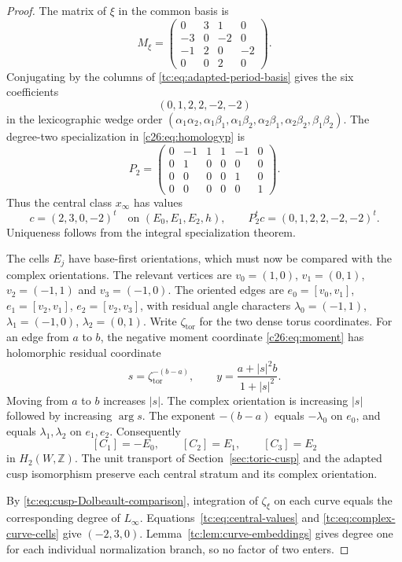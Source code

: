 \begin{proof}
The matrix of $\xi$ in the common basis is
\[
 M_\xi=\begin{pmatrix}
 0&3&1&0\\-3&0&-2&0\\-1&2&0&-2\\0&0&2&0
 \end{pmatrix}.
\]
Conjugating by the columns of
\eqref{tc:eq:adapted-period-basis} gives the six coefficients
\begin{equation}\label{tc:eq:adapted-xi}
                 (0,1,2,2,-2,-2)
\end{equation}
in the lexicographic wedge order
$(\alpha_1\alpha_2,\alpha_1\beta_1,\alpha_1\beta_2,
  \alpha_2\beta_1,\alpha_2\beta_2,\beta_1\beta_2)$.
The degree-two specialization in \eqref{c26:eq:homologyp} is
\[
 P_2=\begin{pmatrix}
 0&-1&1&1&-1&0\\
 0&1&0&0&0&0\\
 0&0&0&0&1&0\\
 0&0&0&0&0&1
 \end{pmatrix}.
\]
Thus the central class $x_\infty$ has values
\begin{equation}\label{tc:eq:central-values}
       c=(2,3,0,-2)^t
       \quad\text{on }(E_0,E_1,E_2,h),
       \qquad P_2^tc=(0,1,2,2,-2,-2)^t.
\end{equation}
Uniqueness follows from the integral specialization theorem.

The cells $E_j$ have base-first orientations, which must now
be compared with the complex orientations.
The relevant vertices are
$v_0=(1,0)$, $v_1=(0,1)$, $v_2=(-1,1)$ and $v_3=(-1,0)$.
The oriented edges are
$e_0=[v_0,v_1]$, $e_1=[v_2,v_1]$, $e_2=[v_2,v_3]$,
with residual angle characters
$\lambda_0=(-1,1)$, $\lambda_1=(-1,0)$, $\lambda_2=(0,1)$.
Write $\zeta_{\mathrm{tor}}$ for the two dense torus coordinates.
For an edge from $a$ to $b$, the negative moment coordinate
\eqref{c26:eq:moment} has holomorphic residual coordinate
\[
 s=\zeta_{\mathrm{tor}}^{-(b-a)},\qquad
                  y=\frac{a+|s|^2b}{1+|s|^2}.
\]
Moving from $a$ to $b$ increases $|s|$.
The complex orientation is increasing $|s|$ followed by
increasing $\arg s$. The exponent $-(b-a)$ equals
$-\lambda_0$ on $e_0$, and equals $\lambda_1,\lambda_2$
on $e_1,e_2$. Consequently
\begin{equation}\label{tc:eq:complex-curve-cells}
                  [C_1]=-E_0,\qquad [C_2]=E_1,
                  \qquad [C_3]=E_2
\end{equation}
in $H_2(W,\mathbb Z)$.
The unit transport of Section~\ref{sec:toric-cusp} and the
adapted cusp isomorphism preserve each central stratum and
its complex orientation.

By \eqref{tc:eq:cusp-Dolbeault-comparison}, integration of
$\zeta_\xi$ on each curve equals the corresponding degree
of $L_\infty$.
Equations~\eqref{tc:eq:central-values} and
\eqref{tc:eq:complex-curve-cells} give $(-2,3,0)$.
Lemma~\ref{tc:lem:curve-embeddings} gives degree one for each
individual normalization branch, so no factor of two enters.
\end{proof}


